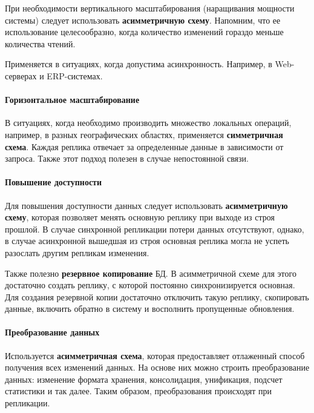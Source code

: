 При необходимости вертикального масштабирования (наращивания мощности системы) следует использовать
\textbf{асимметричную схему}. Напомним, что ее использование целесообразно, когда количество изменений
гораздо меньше количества чтений.

Применяется в ситуациях, когда допустима асинхронность. Например, в Web-серверах и ERP-системах.

\paragraph{Горизонтальное масштабирование}

В ситуациях, когда необходимо производить множество локальных операций, например, в разных географических
областях, применяется \textbf{симметричная схема}. Каждая реплика отвечает за
определенные данные в зависимости от запроса. Также этот подход полезен в случае непостоянной
связи.

\paragraph{Повышение доступности}

Для повышения доступности данных следует использовать \textbf{асимметричную схему}, которая позволяет менять
основную реплику при выходе из строя прошлой. В случае синхронной репликации потери данных
отсутствуют, однако, в случае асинхронной вышедшая из строя основная реплика могла не успеть
разослать другим репликам изменения.

Также полезно \textbf{резервное копирование} БД. В асимметричной схеме для этого достаточно создать
реплику, с которой постоянно синхронизируется основная. Для создания резервной копии достаточно отключить
такую реплику, скопировать данные, включить обратно в систему и восполнить пропущенные обновления.

\paragraph{Преобразование данных}

Используется \textbf{асимметричная схема}, которая предоставляет отлаженный способ получения всех
изменений данных. На основе них можно строить преобразование данных: изменение формата хранения, консолидация,
унификация, подсчет статистики и так далее. Таким образом, преобразования происходят при репликации.